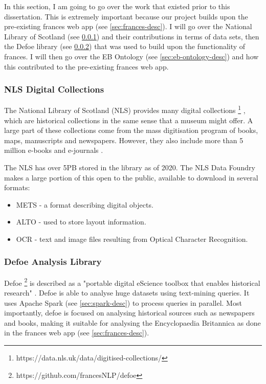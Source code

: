 \documentclass[12pt, letterpaper]{article}
\begin{document}
\begin{flushleft}
In this section, I am going to go over the work that existed prior to this dissertation. This is extremely important because our project builds upon the pre-existing frances web app (see \ref{sec:frances-desc}). I will go over the National Library of Scotland (see \ref{sec:nls-desc}) and their contributions in terms of data sets, then the Defoe library (see \ref{sec:defoe-desc}) that was used to build upon the functionality of frances. I will then go over the EB Ontology (see \ref{sec:eb-ontology-desc}) and how this contributed to the pre-existing frances web app.
\end{flushleft}

\subsubsection{NLS Digital Collections}\label{sec:nls-desc}

The National Library of Scotland (NLS) provides many digital collections
\footnote{https://data.nls.uk/data/digitised-collections/}
, which are historical collections in the same sense that a museum might offer. A large part of these collections come from the mass digitisation program of books, maps, manuscripts and newspapers. However, they also include more than 5 million e-books and e-journals \cite{nls-collections}.

\begin{flushleft}
The NLS has over 5PB stored in the library as of 2020. The NLS Data Foundry makes a large portion of this open to the public, available to download in several formats:
\begin{itemize}
\item METS - a format describing digital objects.
\item ALTO - used to store layout information.
\item OCR - text and image files resulting from Optical Character Recognition.
\end{itemize}
\cite{nls-collections}
\end{flushleft}

\subsubsection{Defoe Analysis Library}\label{sec:defoe-desc}

\begin{flushleft}
Defoe
\footnote{https://github.com/francesNLP/defoe}
is described as a "portable digital eScience toolbox that enables historical research" \cite{defoe}. Defoe is able to analyse huge datasets using text-mining queries. It uses Apache Spark (see \ref{sec:spark-desc}) to process queries in parallel. Most importantly, defoe is focused on analysing historical sources such as newspapers and books, making it suitable for analysing the Encyclopaedia Britannica as done in the frances web app (see \ref{sec:frances-desc}).
\end{flushleft}
\end{document}
